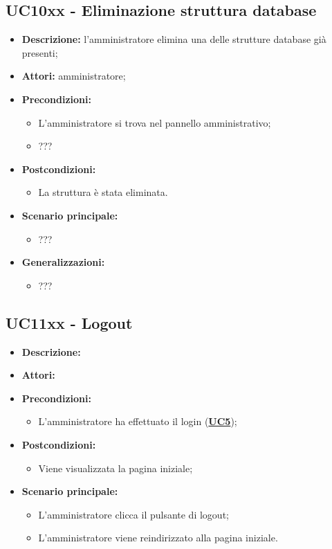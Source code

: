\documentclass[5pt]{article}
\begin{document}
\subsection{UC10xx - Eliminazione struttura database}
\label{sec:10xxx}
\begin{itemize}
    \item \textbf{Descrizione:}  l’amministratore elimina una delle strutture database già presenti;
    \item \textbf{Attori:} amministratore;
    \item \textbf{Precondizioni:} 
    \begin{itemize}
        \item L’amministratore si trova nel pannello amministrativo;
        \item ???
    \end{itemize}
    \item \textbf{Postcondizioni:} 
    \begin{itemize}
        \item La struttura è stata eliminata.
    \end{itemize}
    \item \textbf{Scenario principale:} 
    \begin{itemize}
        \item ???
    \end{itemize}
    \item \textbf{Generalizzazioni:} 
    \begin{itemize}
        \item ???
    \end{itemize}
\end{itemize}

\subsection{UC11xx - Logout}
\label{sec:UC11xxx}
\begin{itemize}
    \item \textbf{Descrizione:} 
    \item \textbf{Attori:} 
    \item \textbf{Precondizioni:} 
    \begin{itemize}
        \item L’amministratore ha effettuato il login (\hyperref[sec:UC5]{\textbf{UC5}});
    \end{itemize}
    \item \textbf{Postcondizioni:} 
    \begin{itemize}
        \item Viene visualizzata la pagina iniziale;
    \end{itemize}
    \item \textbf{Scenario principale:} 
    \begin{itemize}
        \item L’amministratore clicca il pulsante di logout;
        \item L’amministratore viene reindirizzato alla pagina iniziale.
    \end{itemize}
\end{itemize}
\end{document}
